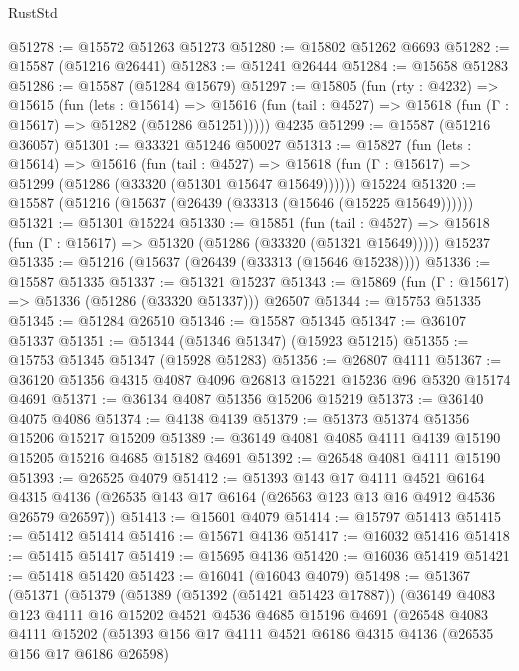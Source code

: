 \begin{lexlean}{RustStd}
\begin{coremodule}
@51278 := @15572 @51263 @51273
@51280 := @15802 @51262 @6693
@51282 := @15587 (@51216 @26441)
@51283 := @51241 @26444
@51284 := @15658 @51283
@51286 := @15587 (@51284 @15679)
@51297 := @15805
    (fun (rty : @4232) =>
    @15615
      (fun (lets : @15614) =>
      @15616 (fun (tail : @4527) => @15618 (fun (Γ : @15617) => @51282 (@51286 @51251)))))
    @4235
@51299 := @15587 (@51216 @36057)
@51301 := @33321 @51246 @50027
@51313 := @15827
    (fun (lets : @15614) =>
    @15616
      (fun (tail : @4527) =>
      @15618 (fun (Γ : @15617) => @51299 (@51286 (@33320 (@51301 @15647 @15649))))))
    @15224
@51320 := @15587 (@51216 (@15637 (@26439 (@33313 (@15646 (@15225 @15649))))))
@51321 := @51301 @15224
@51330 := @15851
    (fun (tail : @4527) => @15618 (fun (Γ : @15617) => @51320 (@51286 (@33320 (@51321 @15649)))))
    @15237
@51335 := @51216 (@15637 (@26439 (@33313 (@15646 @15238))))
@51336 := @15587 @51335
@51337 := @51321 @15237
@51343 := @15869 (fun (Γ : @15617) => @51336 (@51286 (@33320 @51337))) @26507
@51344 := @15753 @51335
@51345 := @51284 @26510
@51346 := @15587 @51345
@51347 := @36107 @51337
@51351 := @51344 (@51346 @51347) (@15923 @51215)
@51355 := @15753 @51345 @51347 (@15928 @51283)
@51356 := @26807 @4111
@51367 := @36120 @51356 @4315 @4087 @4096 @26813 @15221 @15236 @96 @5320 @15174 @4691
@51371 := @36134 @4087 @51356 @15206 @15219
@51373 := @36140 @4075 @4086
@51374 := @4138 @4139
@51379 := @51373 @51374 @51356 @15206 @15217 @15209
@51389 := @36149 @4081 @4085 @4111 @4139 @15190 @15205 @15216 @4685 @15182 @4691
@51392 := @26548 @4081 @4111 @15190
@51393 := @26525 @4079
@51412 := @51393
    @143
    @17
    @4111
    @4521
    @6164
    @4315
    @4136
    (@26535 @143 @17 @6164 (@26563 @123 @13 @16 @4912 @4536 @26579 @26597))
@51413 := @15601 @4079
@51414 := @15797 @51413
@51415 := @51412 @51414
@51416 := @15671 @4136
@51417 := @16032 @51416
@51418 := @51415 @51417
@51419 := @15695 @4136
@51420 := @16036 @51419
@51421 := @51418 @51420
@51423 := @16041 (@16043 @4079)
@51498 := @51367
    (@51371
      (@51379
        (@51389
          (@51392 (@51421 @51423 @17887))
          (@36149
            @4083
            @123
            @4111
            @16
            @15202
            @4521
            @4536
            @4685
            @15196
            @4691
            (@26548
              @4083
              @4111
              @15202
              (@51393
                @156
                @17
                @4111
                @4521
                @6186
                @4315
                @4136
                (@26535 @156 @17 @6186 @26598)

\end{coremodule}
\end{lexlean}
